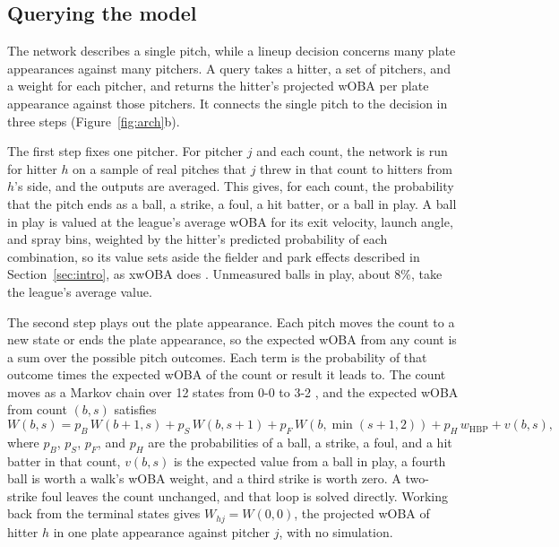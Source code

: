 \documentclass[11pt,letterpaper]{article}
\let\oldsubsection\subsection
\renewcommand\subsection{\FloatBarrier\oldsubsection}
\begin{document}
\subsection{Querying the model}
\label{sec:query}

The network describes a single pitch, while a lineup decision concerns many plate appearances against many pitchers. A query takes a hitter, a set of pitchers, and a weight for each pitcher, and returns the hitter's projected wOBA per plate appearance against those pitchers. It connects the single pitch to the decision in three steps (Figure~\ref{fig:arch}b).

The first step fixes one pitcher. For pitcher $j$ and each count, the network is run for hitter $h$ on a sample of real pitches that $j$ threw in that count to hitters from $h$'s side, and the outputs are averaged. This gives, for each count, the probability that the pitch ends as a ball, a strike, a foul, a hit batter, or a ball in play. A ball in play is valued at the league's average wOBA for its exit velocity, launch angle, and spray bins, weighted by the hitter's predicted probability of each combination, so its value sets aside the fielder and park effects described in Section~\ref{sec:intro}, as xwOBA does \citep{mlbxwoba}. Unmeasured balls in play, about 8\%, take the league's average value.

The second step plays out the plate appearance. Each pitch moves the count to a new state or ends the plate appearance, so the expected wOBA from any count is a sum over the possible pitch outcomes. Each term is the probability of that outcome times the expected wOBA of the count or result it leads to. The count moves as a Markov chain over 12 states from 0-0 to 3-2 \citep{powers2025}, and the expected wOBA from count $(b,s)$ satisfies
\begin{equation}
W(b,s) = p_B\, W(b+1,s) + p_S\, W(b,s+1) + p_F\, W(b,\min(s+1,2)) + p_H\, w_{\text{HBP}} + v(b,s),
\label{eq:chain}
\end{equation}
where $p_B$, $p_S$, $p_F$, and $p_H$ are the probabilities of a ball, a strike, a foul, and a hit batter in that count, $v(b,s)$ is the expected value from a ball in play, a fourth ball is worth a walk's wOBA weight, and a third strike is worth zero. A two-strike foul leaves the count unchanged, and that loop is solved directly. Working back from the terminal states gives $W_{hj} = W(0,0)$, the projected wOBA of hitter $h$ in one plate appearance against pitcher $j$, with no simulation.
\end{document}
